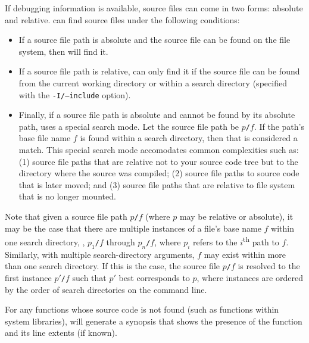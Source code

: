 \documentclass[11pt,letterpaper]{report}
\begin{document}
If debugging information is available, source files can come in two forms: absolute and relative.
\hpcprofAll{} can find source files under the following conditions:
\begin{itemize}
\item If a source file path is absolute and the source file can be found on the file system, then \hpcprofAll{} will find it.
\item If a source file path is relative, \hpcprofAll{} can only find it if the source file can be found from the current working directory or within a search directory (specified with the \texttt{-I/--include} option).
\item Finally, if a source file path is absolute and cannot be found by its absolute path, \hpcprofAll{} uses a special search mode.
Let the source file path be \texttt{$p$/$f$}.
If the path's base file name $f$ is found within a search directory, then that is considered a match.
This special search mode accomodates common complexities such as:
(1) source file paths that are relative not to your source code tree but to the directory where the source was compiled;
(2) source file paths to source code that is later moved; and
(3) source file paths that are relative to file system that is no longer mounted.
\end{itemize}
Note that given a source file path \texttt{$p$/$f$} (where $p$ may be relative or absolute), it may be the case that there are multiple instances of a file's base name $f$ within one search directory, \eg{}, \texttt{$p_1$/$f$} through \texttt{$p_n$/$f$}, where $p_i$ refers to the $i$\textsuperscript{th} path to $f$.
Similarly, with multiple search-directory arguments, $f$ may exist within more than one search directory.
If this is the case, the source file \texttt{$p$/$f$} is resolved to the first instance \texttt{$p'$/$f$} such that $p'$ best corresponds to $p$, where instances are ordered by the order of search directories on the command line.

For any functions whose source code is not found (such as functions within system libraries), \hpcviewer{} will generate a synopsis that shows the presence of the function and its line extents (if known).



\end{document}
